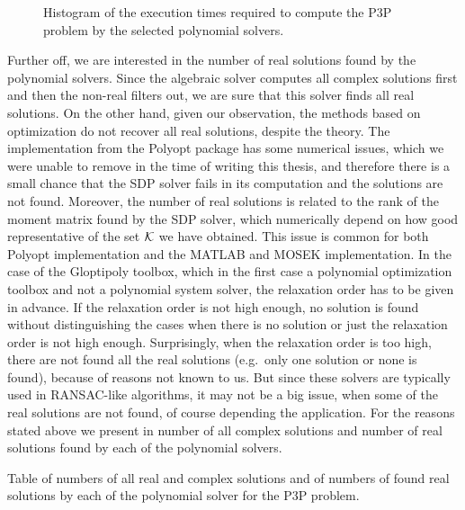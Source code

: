 \begin{figure}[ht]
  \centering
  \resizebox{0.95\textwidth}{!}{}
  \caption{Histogram of the execution times required to compute the P3P problem by the selected polynomial solvers.}
\end{figure}

Further off, we are interested in the number of real solutions found by the polynomial solvers.
Since the algebraic solver computes all complex solutions first and then the non-real filters out, we are sure that this solver finds all real solutions.
On the other hand, given our observation, the methods based on optimization do not recover all real solutions, despite the theory.
The implementation from the Polyopt package has some numerical issues, which we were unable to remove in the time of writing this thesis, and therefore there is a small chance that the SDP solver fails in its computation and the solutions are not found.
Moreover, the number of real solutions is related to the rank of the moment matrix found by the SDP solver, which  numerically depend on how good representative of the set $\mathcal{K}$ we have obtained.
This issue is common for both Polyopt implementation and the MATLAB and MOSEK implementation.
In the case of the Gloptipoly toolbox, which in the first case a polynomial optimization toolbox and not a polynomial system solver, the relaxation order has to be given in advance.
If the relaxation order is not high enough, no solution is found without distinguishing the cases when there is no solution or just the relaxation order is not high enough.
Surprisingly, when the relaxation order is too high, there are not found all the real solutions (e.g.\ only one solution or none is found), because of reasons not known to us.
But since these solvers are typically used in RANSAC-like \cite{ransac} algorithms, it may not be a big issue, when some of the real solutions are not found, of course depending the application.
For the reasons stated above we present in  number of all complex solutions and number of real solutions found by each of the polynomial solvers.

\begin{table}[ht]
  \centering
  
  \caption{Table of numbers of all real and complex solutions and of numbers of found real solutions by each of the polynomial solver for the P3P problem.}
\end{table}

